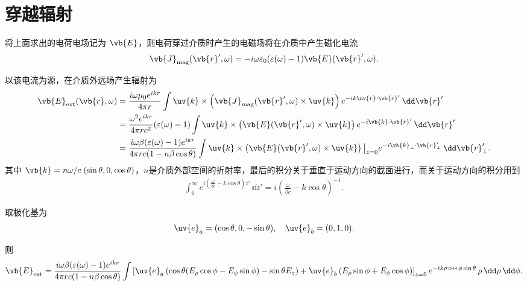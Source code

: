 \section{穿越辐射}

将上面求出的电荷电场记为 \(\vb{E}\)，则电荷穿过介质时产生的电磁场将在介质中产生磁化电流
\begin{align*}
	\vb{J}_{\mathrm{mag}}(\vb{r}', \omega) = -i \omega \varepsilon_{0} (\varepsilon(\omega) - 1) \vb{E}(\vb{r}', \omega).
\end{align*}

以该电流为源，在介质外远场产生辐射为
\begin{align*}
	\vb{E}_{\mathrm{ext}}(\vb{r}, \omega) &= \frac{i \omega \mu_{0} e^{i k r}}{4\pi r} \int \uv{k} \times \left( \vb{J}_{\mathrm{mag}}(\vb{r}', \omega) \times \uv{k} \right) e^{-i k \uv{r} \cdot \vb{r}'} \, \dd \vb{r}' \\
	&= \frac{\omega^{2} e^{i k r}}{4\pi r c^{2}} (\varepsilon(\omega) - 1) \int \uv{k} \times \left( \vb{E}(\vb{r}', \omega) \times \uv{k} \right) e^{-i \vb{k} \cdot \vb{r}'} \, \dd \vb{r}' \\
	&= \frac{i \omega \beta (\varepsilon(\omega) - 1) e^{i k r}}{4\pi r c (1 - n \beta \cos\theta)} \int \uv{k} \times \left( \vb{E}(\vb{r}', \omega) \times \uv{k} \right)\big|_{z=0} e^{-i \vb{k}_{\perp} \cdot \vb{r}_{\perp}'} \, \dd \vb{r}_{\perp}'.
\end{align*}
其中 \(\vb{k} = n \omega/c \;(\sin\theta, 0, \cos\theta)\)，\(n\)是介质外部空间的折射率，最后的积分关于垂直于运动方向的截面进行，而关于运动方向的积分用到
\begin{align*}
	\int_{0}^{\infty} e^{i \left( \frac{\omega}{\beta c} - k \cos\theta \right) z'} \, \dd z' = i \left( \frac{\omega}{\beta c} - k \cos\theta \right)^{-1}.
\end{align*}

取极化基为
\begin{align*}
	\uv{e}_{a} = (\cos\theta, 0, -\sin\theta), \quad
	\uv{e}_{b} = (0, 1, 0).
\end{align*}

则
{\small
\begin{equation*}
	\begin{split}
		\vb{E}_{\mathrm{ext}} = \frac{i \omega \beta (\varepsilon(\omega) - 1) e^{i k r}}{4\pi r c (1 - n \beta \cos\theta)} \int \left[ \uv{e}_{a} \left( \cos\theta (E_{\rho} \cos\phi - E_{\phi} \sin\phi) - \sin\theta E_{z} \right) + \uv{e}_{b} \left( E_{\rho} \sin\phi + E_{\phi} \cos\phi \right) \right]_{z=0} e^{-i k \rho \cos\phi \sin\theta} \, \rho \, \dd \rho \, \dd \phi.
	\end{split}
\end{equation*}
}

